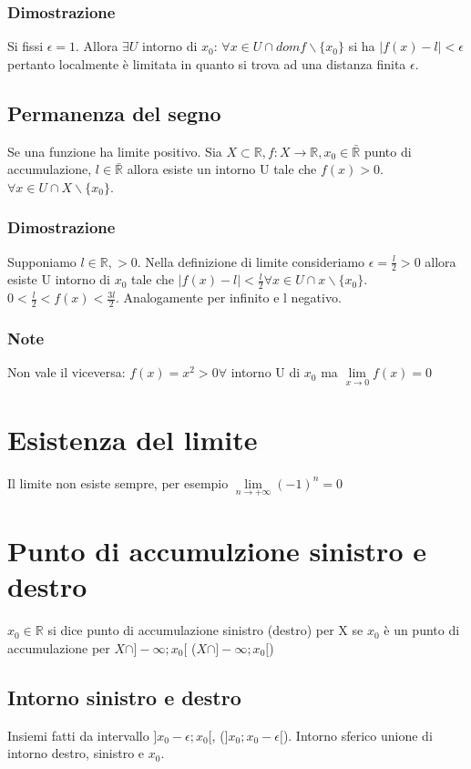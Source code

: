 \subsubsection{Dimostrazione}
Si fissi $\epsilon=1$. Allora $\exists U$ intorno di $x_0$: $\forall x\in U\cap domf\backslash\{x_0\}$ si ha $|f(x)-l|<\epsilon$ pertanto localmente \`e limitata in quanto
si trova ad una distanza finita $\epsilon$.
\subsection{Permanenza del segno}
Se una funzione ha limite positivo.
Sia $X\subset\mathbb{R}, f:X\rightarrow\mathbb{R}, x_0\in\bar{\mathbb{R}}$ punto di accumulazione, $l\in\bar{\mathbb{R}}$ allora esiste un intorno U tale che $f(x)>0$.
$\forall x\in U\cap X\backslash\{x_0\}$.
\subsubsection{Dimostrazione}
Supponiamo $l\in\mathbb{R},>0$. Nella definizione di limite consideriamo $\epsilon=\frac{l}{2}>0$ allora esiste U intorno di $x_0$ tale che $|f(x)-l|<\frac{l}{2}\forall x\in U\cap x\backslash\{x_0\}$. $0<\frac{l}{2}<f(x)<\frac{3l}{2}$.
Analogamente per infinito e l negativo.
\subsubsection{Note}
Non vale il viceversa: $f(x)=x^2>0 \forall$ intorno U di $x_0$ ma $\lim\limits_{x\rightarrow 0} f(x)=0$
\section{Esistenza del limite}
Il limite non esiste sempre, per esempio $\lim\limits_{n\rightarrow +\infty} (-1)^n=0$
\section{Punto di accumulzione sinistro e destro}
$x_0\in\mathbb{R}$ si dice punto di accumulazione sinistro (destro) per X se $x_0$ \`e un punto di accumulazione per $X\cap]-\infty;x_0[$ ($X\cap]-\infty;x_0[$)
\subsection{Intorno sinistro e destro}
Insiemi fatti da intervallo $]x_0-\epsilon;x_0[$, ($]x_0;x_0-\epsilon[$). Intorno sferico unione di intorno destro, sinistro e $x_0$.
